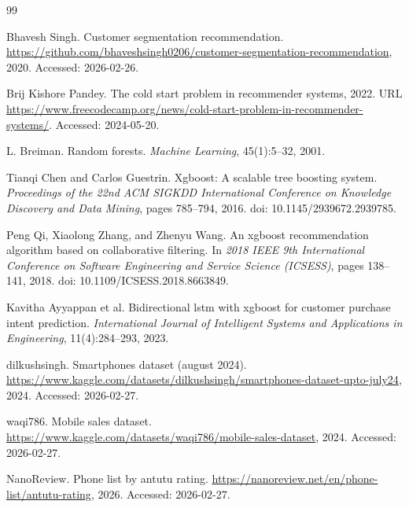 \documentclass[12pt, a4paper]{report}
\numberwithin{equation}{chapter}
\begin{document}
\renewcommand{\bibname}{References}
\begin{thebibliography}{99}

Bhavesh Singh. Customer segmentation recommendation. \url{https://github.com/bhaveshsingh0206/customer-segmentation-recommendation}, 2020. Accessed: 2026-02-26.

Brij Kishore Pandey. The cold start problem in recommender systems, 2022. URL \url{https://www.freecodecamp.org/news/cold-start-problem-in-recommender-systems/}. Accessed: 2024-05-20.

L. Breiman. Random forests. \textit{Machine Learning}, 45(1):5--32, 2001.

Tianqi Chen and Carlos Guestrin. Xgboost: A scalable tree boosting system. \textit{Proceedings of the 22nd ACM SIGKDD International Conference on Knowledge Discovery and Data Mining}, pages 785--794, 2016. doi: 10.1145/2939672.2939785.

Peng Qi, Xiaolong Zhang, and Zhenyu Wang. An xgboost recommendation algorithm based on collaborative filtering. In \textit{2018 IEEE 9th International Conference on Software Engineering and Service Science (ICSESS)}, pages 138--141, 2018. doi: 10.1109/ICSESS.2018.8663849.

Kavitha Ayyappan et al. Bidirectional lstm with xgboost for customer purchase intent prediction. \textit{International Journal of Intelligent Systems and Applications in Engineering}, 11(4):284--293, 2023.

dilkushsingh. Smartphones dataset (august 2024). \url{https://www.kaggle.com/datasets/dilkushsingh/smartphones-dataset-upto-july24}, 2024. Accessed: 2026-02-27.

waqi786. Mobile sales dataset. \url{https://www.kaggle.com/datasets/waqi786/mobile-sales-dataset}, 2024. Accessed: 2026-02-27.

NanoReview. Phone list by antutu rating. \url{https://nanoreview.net/en/phone-list/antutu-rating}, 2026. Accessed: 2026-02-27.

\end{thebibliography}
\end{document}
